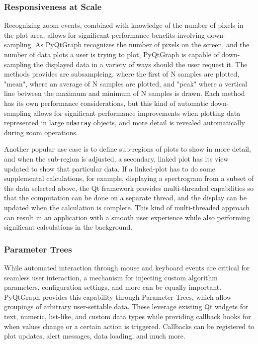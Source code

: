 \documentclass[journal]{vgtc}                %
\begin{document}
\subsubsection{Responsiveness at Scale} %

Recognizing zoom events, combined with knowledge of the number of pixels in the plot area, allows for significant performance benefits involving down-sampling.  As PyQtGraph recognizes the number of pixels on the screen, and the number of data plots a user is trying to plot, PyQtGraph is capable of down-sampling the displayed data in a variety of ways should the user request it.  The methods provides are subsampleing, where the first of N samples are plotted, "mean", where an average of N samples are plotted, and "peak" where a vertical line between the maximum and minimum of N samples is drawn.  Each method has its own performance considerations, but this kind of automatic down-sampling allows for significant performance improvements when plotting data represented in large \texttt{ndarray} objects, and more detail is revealed automatically during zoom operations.

\color{red}
Another popular use case is to define sub-regions of plots to show in more detail, and when the sub-region is adjusted, a secondary, linked plot has its view updated to show that particular data.  If a linked-plot has to do some supplemental calculations, for example, displaying a spectrogram from a subset of the data selected above, the Qt framework provides multi-threaded capabilities so that the computation can be done on a separate thread, and the display can be updated when the calculation is complete.  This kind of multi-threaded approach can result in an application with a smooth user experience while also performing significant calculations in the background.

\color{black}

\subsubsection{Parameter Trees}\label{sec:paramtrees}
While automated interaction through mouse and keyboard events are critical for seamless user interaction, a mechanism for injecting custom algorithm parameters, configuration settings, and more can be equally important. PyQtGraph provides this capability through Parameter Trees, which allow groupings of arbitrary user-settable data. These leverage existing Qt widgets for text, numeric, list-like, and custom data types while providing callback hooks for when values change or a certain action is triggered. Callbacks can be registered to plot updates, alert messages, data loading, and much more.
\end{document}
